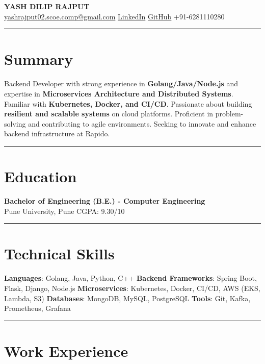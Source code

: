 \documentclass[a4paper,10pt]{article}
\begin{document}
\begin{center}
    {\LARGE \textbf{YASH DILIP RAJPUT}}\\
    \href{mailto:yashrajput02.scoe.comp@gmail.com}{yashrajput02.scoe.comp@gmail.com} \textbar
    \href{https://www.linkedin.com/in/yashrajput7232}{LinkedIn} \textbar
    \href{https://github.com/yash7232}{GitHub} \textbar
    +91-6281110280
\end{center}

\hrule
\vspace{3pt}
\section*{Summary}
Backend Developer with strong experience in \textbf{Golang/Java/Node.js} and expertise in \textbf{Microservices Architecture and Distributed Systems}. Familiar with \textbf{Kubernetes, Docker, and CI/CD}. Passionate about building \textbf{resilient and scalable systems} on cloud platforms. Proficient in problem-solving and contributing to agile environments. Seeking to innovate and enhance backend infrastructure at Rapido.

\vspace{3 pt}
\hrule
\vspace{3pt}

\section*{Education}
\textbf{Bachelor of Engineering (B.E.) - Computer Engineering}\\
Pune University, Pune \hfill CGPA: 9.30/10
\vspace{3 pt}
\hrule
\vspace{3 pt}

\section*{Technical Skills}
\textbf{Languages}: Golang, Java, Python, C++ \textbar \space
\textbf{Backend Frameworks}: Spring Boot, Flask, Django, Node.js \textbar \space
\textbf{Microservices}: Kubernetes, Docker, CI/CD, AWS (EKS, Lambda, S3) \textbar \space
\textbf{Databases}: MongoDB, MySQL, PostgreSQL \textbar \space
\textbf{Tools}: Git, Kafka, Prometheus, Grafana
\vspace{3}

\hrule
\vspace{3pt}

\section*{Work Experience}
\end{document}
